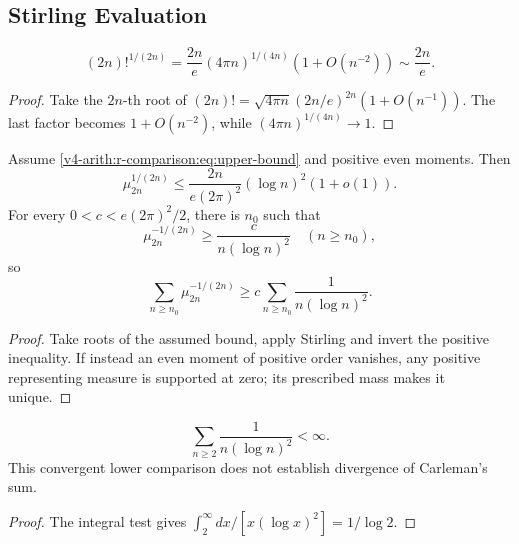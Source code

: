 \subsection{Stirling Evaluation}
\label{v4-arith:r-comparison:corrected-stirling}
\begin{lemma}
\label{v4-arith:r-comparison:lem:stirling}
\[
 (2n)!^{1/(2n)}=\frac{2n}{e}(4\pi n)^{1/(4n)}
 (1+O(n^{-2}))\sim\frac{2n}{e}.
\]
\end{lemma}
\begin{proof}
Take the \(2n\)-th root of
\((2n)!=\sqrt{4\pi n}(2n/e)^{2n}(1+O(n^{-1}))\).
The last factor becomes \(1+O(n^{-2})\), while
\((4\pi n)^{1/(4n)}\to1\).
\end{proof}
\begin{proposition}
\label{v4-arith:r-comparison:prop:BL-carleman-corrected}
Assume \eqref{v4-arith:r-comparison:eq:upper-bound} and positive even moments. Then
\begin{equation}
\label{v4-arith:r-comparison:eq:mu-power}
 \mu_{2n}^{1/(2n)}\leq
 \frac{2n}{e(2\pi)^2}(\log n)^2(1+o(1)).
\end{equation}
For every \(0<c<e(2\pi)^2/2\), there is \(n_0\) such that
\begin{equation}
\label{v4-arith:r-comparison:eq:mu-inverse-lower}
 \mu_{2n}^{-1/(2n)}\geq\frac{c}{n(\log n)^2}\quad(n\geq n_0),
\end{equation}
so
\begin{equation}
\label{v4-arith:r-comparison:eq:carleman-bound}
 \sum_{n\geq n_0}\mu_{2n}^{-1/(2n)}
 \geq c\sum_{n\geq n_0}\frac1{n(\log n)^2}.
\end{equation}
\end{proposition}
\begin{proof}
Take roots of the assumed bound, apply Stirling and invert the
positive inequality. If instead an even moment of positive order
vanishes, any positive representing measure is supported at zero;
its prescribed mass makes it unique.
\end{proof}
\begin{corollary}
\label{v4-arith:r-comparison:cor:inconclusive}
\begin{equation}
\label{v4-arith:r-comparison:eq:bertrand}
 \sum_{n\geq2}\frac1{n(\log n)^2}<\infty.
\end{equation}
This convergent lower comparison does not establish divergence of
Carleman's sum.
\end{corollary}
\begin{proof}
The integral test gives
\(\int_2^\infty dx/[x(\log x)^2]=1/\log2\).
\end{proof}
